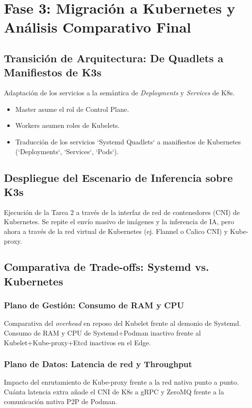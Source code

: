 \documentclass[11pt, a4paper]{report}
\begin{document}
\chapter{Fase 3: Migración a Kubernetes y Análisis Comparativo Final}

\section{Transición de Arquitectura: De Quadlets a Manifiestos de K3s}
Adaptación de los servicios a la semántica de \textit{Deployments} y \textit{Services} de K8s.
\begin{itemize}
    \item Master asume el rol de Control Plane.
    \item Workers asumen roles de Kubelets.
    \item Traducción de los servicios `Systemd Quadlets` a manifiestos de Kubernetes (`Deployments`, `Services`, `Pods`).
\end{itemize}

\section{Despliegue del Escenario de Inferencia sobre K3s}
Ejecución de la Tarea 2 a través de la interfaz de red de contenedores (CNI) de Kubernetes. Se repite el envío masivo de imágenes y la inferencia de IA, pero ahora a través de la red virtual de Kubernetes (ej. Flannel o Calico CNI) y Kube-proxy.

\section{Comparativa de Trade-offs: Systemd vs. Kubernetes}
\subsection{Plano de Gestión: Consumo de RAM y CPU}
Comparativa del \textit{overhead} en reposo del Kubelet frente al demonio de Systemd. Consumo de RAM y CPU de Systemd+Podman inactivo frente al Kubelet+Kube-proxy+Etcd inactivos en el Edge.

\subsection{Plano de Datos: Latencia de red y Throughput}
Impacto del enrutamiento de Kube-proxy frente a la red nativa punto a punto. Cuánta latencia extra añade el CNI de K8s a gRPC y ZeroMQ frente a la comunicación nativa P2P de Podman.
\end{document}
